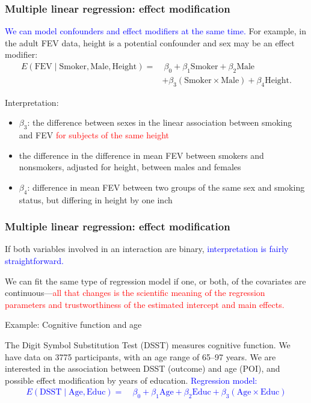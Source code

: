 \documentclass[12pt, 
hyperref={colorlinks=true, linkcolor=blue, urlcolor=cyan}]{beamer}
\begin{document}
\begin{frame}
\frametitle{Multiple linear regression: effect modification}

\textcolor{blue}{We can model confounders and effect modifiers at the same time.} For example, in the adult FEV data, height is a potential confounder and sex may be an effect modifier:
\begin{align*}
E(\text{FEV} \mid \text{Smoker}, \text{Male}, \text{Height}) = & \ \beta_0 + \beta_1 \text{Smoker} + \beta_2 \text{Male}\\
& + \beta_3 (\text{Smoker} \times \text{Male}) + \beta_4 \text{Height}.
\end{align*}

Interpretation: \vspace{-0.2cm}
\begin{itemize}
\item $\beta_3$: the difference between sexes in the linear association between smoking and FEV \textcolor{red}{for subjects of the same height}
\item[] the difference in the difference in mean FEV between smokers and nonsmokers, adjusted for height, between males and females
\item $\beta_4$: difference in mean FEV between two groups of the same sex and smoking status, but differing in height by one inch
\end{itemize}
\end{frame}

\begin{frame}
\frametitle{Multiple linear regression: effect modification}

If both variables involved in an interaction are binary, \textcolor{blue}{interpretation is fairly straightforward.}

We can fit the same type of regression model if one, or both, of the covariates are continuous---\textcolor{red}{all that changes is the scientific meaning of the regression parameters and trustworthiness of the estimated intercept and main effects.}

Example: Cognitive function and age

The Digit Symbol Substitution Test (DSST) measures cognitive function. We have data on 3775 participants, with an age range of 65--97 years. We are interested in the association between DSST (outcome) and age (POI), and possible effect modification by years of education. \textcolor{blue}{Regression model: 
\begin{align*}
E(\text{DSST} \mid \text{Age}, \text{Educ}) =& \ \beta_0 + \beta_1 \text{Age} + \beta_2 \text{Educ} + \beta_3 (\text{Age} \times \text{Educ})
\end{align*}
}
\end{frame}
\end{document}
